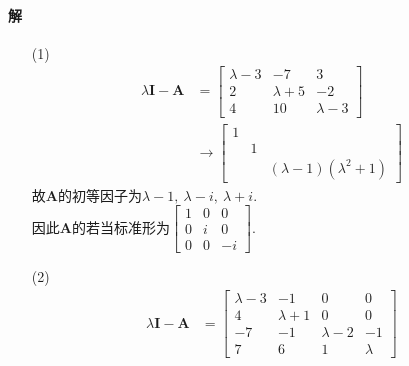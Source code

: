 \documentclass[12pt, a4paper, oneside, fontset=none]{ctexart}
\begin{document}
\paragraph*{解}
\begin{enumerate}
    \item[(1)]
        \begin{align*}
            \lambda\bm{I} - \bm{A} & = \begin{bmatrix}
                                           \lambda - 3 & -7          & 3           \\
                                           2           & \lambda + 5 & -2          \\
                                           4           & 10          & \lambda - 3
                                       \end{bmatrix} \\
                                   & \to \begin{bmatrix}
                                             1 &   &                             \\
                                               & 1 &                             \\
                                               &   & (\lambda - 1)(\lambda^2 +1)
                                         \end{bmatrix}
        \end{align*}
        故$\bm{A}$的初等因子为$\lambda - 1,\ \lambda - i,\ \lambda + i.$ \\
        因此$\bm{A}$的若当标准形为$\begin{bmatrix}
                1 & 0 & 0  \\
                0 & i & 0  \\
                0 & 0 & -i
            \end{bmatrix}.$
    \item[(2)]
        \begin{align*}
            \lambda\bm{I} - \bm{A} & = \begin{bmatrix}
                                           \lambda - 3 & -1          & 0           & 0       \\
                                           4           & \lambda + 1 & 0           & 0       \\
                                           -7          & -1          & \lambda - 2 & -1      \\
                                           7           & 6           & 1           & \lambda

\end{bmatrix}
\end{align*}
\end{enumerate}
\end{document}

